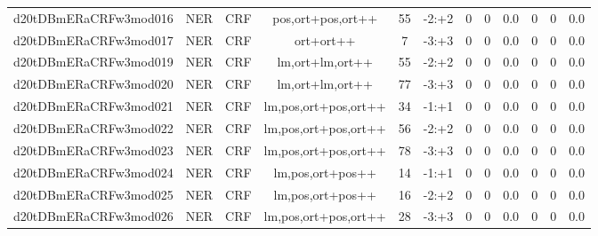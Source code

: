 \documentclass[a4paper]{article}
\begin{document}
\begin{landscape}
\begin{center}
\begin{tabular}{ |c|c|c|c|c|c|c|c|c|c|c|c|}
 
 	
 	\small{ d20tDBmERaCRFw3mod016 } & \small{ NER} & \small{  CRF }  & pos,ort+pos,ort++  &  55 &  \small{  -2:+2 }  &  0 & 0 & 0.0  &  0 & 0 & 0.0 \\
 	

 
 	
 	\small{ d20tDBmERaCRFw3mod017 } & \small{ NER} & \small{  CRF }  & ort+ort++  &  7 &  \small{  -3:+3 }  &  0 & 0 & 0.0  &  0 & 0 & 0.0 \\
 	

 
 	
 	\small{ d20tDBmERaCRFw3mod019 } & \small{ NER} & \small{  CRF }  & lm,ort+lm,ort++  &  55 &  \small{  -2:+2 }  &  0 & 0 & 0.0  &  0 & 0 & 0.0 \\
 	

 
 	
 	\small{ d20tDBmERaCRFw3mod020 } & \small{ NER} & \small{  CRF }  & lm,ort+lm,ort++  &  77 &  \small{  -3:+3 }  &  0 & 0 & 0.0  &  0 & 0 & 0.0 \\
 	

 
 	
 	\small{ d20tDBmERaCRFw3mod021 } & \small{ NER} & \small{  CRF }  & lm,pos,ort+pos,ort++  &  34 &  \small{  -1:+1 }  &  0 & 0 & 0.0  &  0 & 0 & 0.0 \\
 	

 
 	
 	\small{ d20tDBmERaCRFw3mod022 } & \small{ NER} & \small{  CRF }  & lm,pos,ort+pos,ort++  &  56 &  \small{  -2:+2 }  &  0 & 0 & 0.0  &  0 & 0 & 0.0 \\
 	

 
 	
 	\small{ d20tDBmERaCRFw3mod023 } & \small{ NER} & \small{  CRF }  & lm,pos,ort+pos,ort++  &  78 &  \small{  -3:+3 }  &  0 & 0 & 0.0  &  0 & 0 & 0.0 \\
 	

 
 	
 	\small{ d20tDBmERaCRFw3mod024 } & \small{ NER} & \small{  CRF }  & lm,pos,ort+pos++  &  14 &  \small{  -1:+1 }  &  0 & 0 & 0.0  &  0 & 0 & 0.0 \\
 	

 
 	
 	\small{ d20tDBmERaCRFw3mod025 } & \small{ NER} & \small{  CRF }  & lm,pos,ort+pos++  &  16 &  \small{  -2:+2 }  &  0 & 0 & 0.0  &  0 & 0 & 0.0 \\
 	

 
 	
 	\small{ d20tDBmERaCRFw3mod026 } & \small{ NER} & \small{  CRF }  & lm,pos,ort+pos,ort++  &  28 &  \small{  -3:+3 }  &  0 & 0 & 0.0  &  0 & 0 & 0.0 \\
 	


\end{tabular}
\end{center}
\end{landscape}
\end{document}
